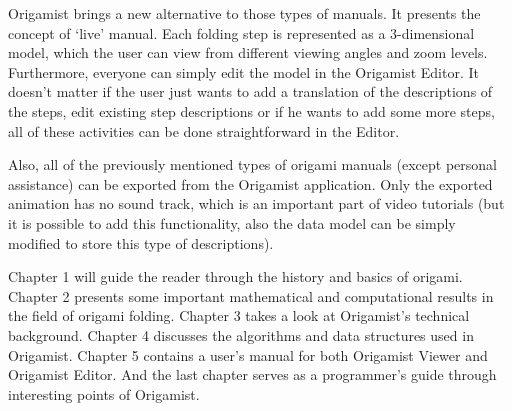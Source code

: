 Origamist brings a new alternative to those types of manuals. It presents the concept of `live' manual. Each folding step is represented as a 3-dimensional model, which the user can view from different viewing angles and zoom levels. Furthermore, everyone can simply edit the model in the Origamist Editor. It doesn't matter if the user just wants to add a translation of the descriptions of the steps, edit existing step descriptions or if he wants to add some more steps, all of these activities can be done straightforward in the Editor.

Also, all of the previously mentioned types of origami manuals (except personal assistance) can be exported from the Origamist application. Only the exported animation has no sound track, which is an important part of video tutorials (but it is possible to add this functionality, also the data model can be simply modified to store this type of descriptions).

Chapter 1 will guide the reader through the history and basics of origami. Chapter 2 presents some important mathematical and computational results in the field of origami folding. Chapter 3 takes a look at Origamist's technical background. Chapter 4 discusses the algorithms and data structures used in Origamist. Chapter 5 contains a user's manual for both Origamist Viewer and Origamist Editor. And the last chapter serves as a programmer's guide through interesting points of Origamist.
